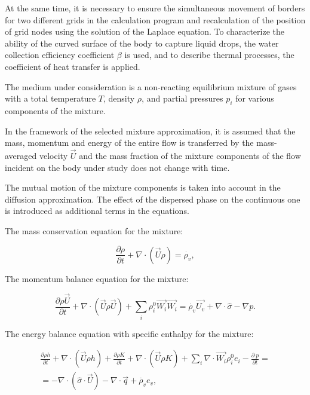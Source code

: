 \documentclass[aerospace,article,submit,moreauthors,pdftex]{Definitions/mdpi}
\begin{document}
At the same time, it is necessary to ensure the simultaneous movement of borders for two different grids in the calculation program and recalculation of the position of grid nodes using the solution of the Laplace equation. To characterize the ability of the curved surface of the body to capture liquid drops, the water collection efficiency coefficient $\beta$ is used, and to describe thermal processes, the coefficient of heat transfer is applied.

The medium under consideration is a non-reacting equilibrium mixture of gases with a total temperature $T$, density $\rho$, and partial pressures $p_i$ for various components of the mixture.

In the framework of the selected mixture approximation, it is assumed that the mass, momentum and energy of the entire flow is transferred by the 	mass-averaged velocity $\vec{U}$ and the mass fraction of the mixture components of the flow incident on the body under study does not change with time.

The mutual motion of the mixture components is taken into account in the diffusion approximation. The effect of the dispersed phase on the continuous one is introduced as additional terms in the equations.

The mass conservation equation for the mixture:

\begin{equation}
    \frac{\partial\rho}{\partial t} + \nabla \cdot (\vec{U}\rho) = \dot{\rho_{v}},
\end{equation}

The momentum balance equation for the mixture:

\begin{equation}
     \frac{\partial\rho\vec{U}}{\partial t} + \nabla \cdot \left( \vec{U}\rho\vec{U} \right) + \sum_{i}^{}{\rho_{i}^{0}\vec{W_{i}}\vec{W_{i}}} = \dot{\rho_{v}}\vec{U_{v}} + \nabla \cdot \widehat{\sigma} - \nabla p.  %
\end{equation}

The energy balance equation with specific enthalpy for the mixture:

\begin{multline}
    \frac{\partial\rho h}{\partial t} + \nabla \cdot \left( \vec{U}\rho h \right) + \frac{\partial\rho K}{\partial t}  + \nabla \cdot \left( \vec{U}\rho K \right) +  \sum_{i}^{}{\nabla \cdot \vec{W_{i}}\rho_{i}^{0}e_{i}}  - \frac{\partial\ p}{\partial t}  = \\
    =  - \nabla \cdot (\widehat{\sigma} \cdot \vec{U}) - \nabla \cdot \vec{q} + \dot{\rho_{v}}e_{v}, 
\end{multline}
\end{document}
